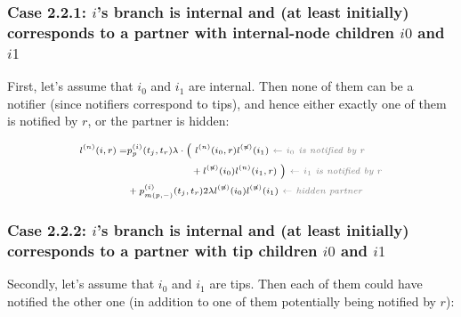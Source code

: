 \documentclass[10pt,letterpaper]{article}
\begin{document}
\subsubsection*{Case 2.2.1: $i$'s branch is internal and (at least initially) corresponds to a partner with internal-node children $i0$ and $i1$} 

First, let's assume that $i_0$ and $i_1$ are internal. Then none of them can be a notifier (since notifiers correspond to tips), and hence either exactly one of them is notified by $r$, or the partner is hidden:

\begin{equation}
\scriptsize
\begin{split}
l^{(n)}(i, r) = &p_{p}^{(i)}(t_j, t_r) \lambda \cdot
\Big(~l^{(n)}(i_0,r)l^{(\not{n})}(i_1) \textit{\color{gray}~$\leftarrow$ $i_0$ is notified by $r$} \\
& ~~~~~~~~~~~~~~~~~~~+ l^{(\not{n})}(i_0)l^{(n)}(i_1,r)~\Big) \textit{\color{gray}~$\leftarrow$ $i_1$ is notified by $r$} \\
& + p_{m(p,-)}^{(i)}(t_j,t_r) 2 \lambda l^{(\not{n})}(i_0)l^{(\not{n})}(i_1) \textit{\color{gray}~$\leftarrow$ hidden partner}\\
 \end{split}
\label{eq:lp-int-int}
\end{equation}

\subsubsection*{Case 2.2.2: $i$'s branch is internal and (at least initially) corresponds to a partner with tip children $i0$ and $i1$} 
Secondly, let's assume that $i_0$ and $i_1$ are tips. Then each of them could have notified the other one (in addition to one of them potentially being notified by $r$):
\end{document}
